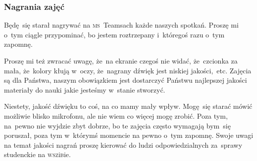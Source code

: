 \documentclass[10pt,t]{beamer}
\begin{document}
\begin{frame}
  \frametitle{Nagrania zajęć}


  Będę~się starał nagrywać na \textsc{ms}~Teamsach każde naszych spotkań.
  Proszę mi o~tym ciągle przypominać, bo jestem roztrzepany i~któregoś
  razu o~tym zapomnę.

  Proszę mi też zwracać uwagę, że~na ekranie czegoś nie widać,
  że~czcionka za mała, że~kolory kłują w~oczy, że~nagrany dźwięk
  jest niskiej jakości,~etc. Zajęcia są dla Państwa, naszym obowiązkiem jest
  dostarczyć Państwu najlepszej jakości materiały do nauki jakie jesteśmy
  w~stanie stworzyć.

  Niestety, jakość dźwięku to coś, na co mamy mały wpływ. Mogę~się starać
  mówić możliwie blisko mikrofonu, ale nie wiem co więcej mogę zrobić.
  Poza tym, na~pewno nie wyjdzie zbyt dobrze, bo te zajęcia często wymagają
  bym~się poruszał, poza tym w~którymś momencie na pewno o~tym zapomnę.
  Swoje uwagi na temat jakości nagrań proszę kierować do ludzi
  odpowiedzialnych za~sprawy studenckie na \textsc{wsz}i\textsc{b}ie.

\end{frame}
\end{document}
